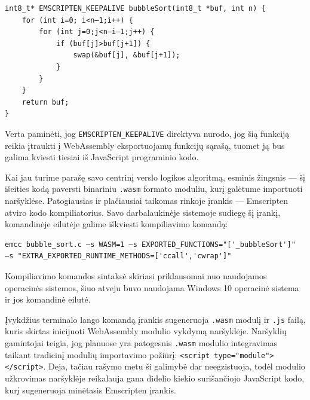 \documentclass{VUMIFPSkursinis}
\begin{document}
\begin{center}
\begin{small}
\begin{verbatim}
int8_t* EMSCRIPTEN_KEEPALIVE bubbleSort(int8_t *buf, int n) {
    for (int i=0; i<n—1;i++) {
        for (int j=0;j<n—i—1;j++) {
            if (buf[j]>buf[j+1]) {
                swap(&buf[j], &buf[j+1]);
            }
        }
    }
    return buf;
}
\end{verbatim}
\end{small}
\end{center}

Verta paminėti, jog \verb|EMSCRIPTEN_KEEPALIVE| direktyva nurodo, jog šią funkciją reikia įtraukti į WebAssembly eksportuojamų funkcijų sąrašą, tuomet ją bus galima kviesti tiesiai iš JavaScript programinio kodo. \cite{EMD17}

Kai jau turime parašę savo centrinį verslo logikos algoritmą, esminis žingsnis — šį išeities kodą paversti binariniu \verb|.wasm| formato moduliu, kurį galėtume importuoti naršyklėse. Patogiausias ir plačiausiai taikomas rinkoje įrankis — Emscripten atviro kodo kompiliatorius. Savo darbalaukinėje sistemoje sudiegę šį įrankį, komandinėje eilutėje galime iškviesti kompiliavimo komandą:

\begin{center}
\begin{small}
\begin{verbatim}
emcc bubble_sort.c —s WASM=1 —s EXPORTED_FUNCTIONS="['_bubbleSort']" 
—s "EXTRA_EXPORTED_RUNTIME_METHODS=['ccall','cwrap']"
\end{verbatim}
\end{small}
\end{center}

Kompiliavimo komandos sintaksė skiriasi priklausomai nuo naudojamos operacinės sistemos, šiuo atveju buvo naudojama Windows 10 operacinė sistema ir jos komandinė eilutė.

Įvykdžius terminalo lango komandą įrankis sugeneruoja \verb|.wasm| modulį ir \verb|.js| failą, kuris skirtas inicijuoti WebAssembly modulio vykdymą naršyklėje. Naršyklių gamintojai teigia, jog planuose yra patogesnis \verb|.wasm| modulio integravimas taikant tradicinį modulių importavimo požiūrį: \verb|<script type="module"></script>|. Deja, tačiau rašymo metu ši galimybė dar neegzistuoja, todėl modulio užkrovimas naršyklėje reikalauja gana didelio kiekio surišančiojo JavaScript kodo, kurį sugeneruoja minėtasis Emscripten įrankis.
\end{document}
